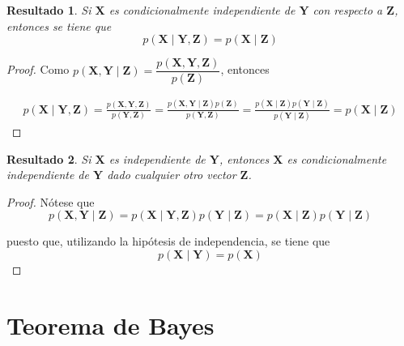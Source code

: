 \documentclass[
  10pt,
  spanish,
]{book}
\newtheorem{proposition}{Resultado}[chapter]
\theoremstyle{definition}
\theoremstyle{definition}
\theoremstyle{definition}
\theoremstyle{definition}
\theoremstyle{remark}
\begin{document}
\begin{proposition}
\protect\hypertarget{prp:Res122}{}{\label{prp:Res122} }Si \(\mathbf{X}\) es condicionalmente independiente de \(\mathbf{Y}\) con respecto a \(\mathbf{Z}\), entonces se tiene que
\begin{equation}
p(\mathbf{X} \mid \mathbf{Y},\mathbf{Z})=p(\mathbf{X} \mid \mathbf{Z})
\end{equation}
\end{proposition}

\begin{proof}
{}Como \(p(\mathbf{X},\mathbf{Y} \mid \mathbf{Z})=\dfrac{p(\mathbf{X},\mathbf{Y},\mathbf{Z})}{p(\mathbf{Z})}\), entonces

\begin{align*}
p(\mathbf{X} \mid \mathbf{Y},\mathbf{Z})=\frac{p(\mathbf{X},\mathbf{Y},\mathbf{Z})}{p(\mathbf{Y},\mathbf{Z})}
=\frac{p(\mathbf{X},\mathbf{Y} \mid \mathbf{Z})p(\mathbf{Z})}{p(\mathbf{Y},\mathbf{Z})}
=\frac{p(\mathbf{X} \mid \mathbf{Z})p(\mathbf{Y} \mid \mathbf{Z})}{p(\mathbf{Y} \mid \mathbf{Z})}=p(\mathbf{X} \mid \mathbf{Z})
\end{align*}
\end{proof}

\begin{proposition}
\protect\hypertarget{prp:unnamed-chunk-8}{}{\label{prp:unnamed-chunk-8} }Si \(\mathbf{X}\) es independiente de \(\mathbf{Y}\), entonces \(\mathbf{X}\) es condicionalmente independiente de \(\mathbf{Y}\) dado cualquier otro vector \(\mathbf{Z}\).
\end{proposition}

\begin{proof}
{}Nótese que
\begin{equation*}
p(\mathbf{X},\mathbf{Y}\mid \mathbf{Z})=p(\mathbf{X} \mid \mathbf{Y},\mathbf{Z})p(\mathbf{Y} \mid \mathbf{Z})=p(\mathbf{X} \mid \mathbf{Z})p(\mathbf{Y} \mid \mathbf{Z})
\end{equation*}

puesto que, utilizando la hipótesis de independencia, se tiene que
\begin{equation*}
p(\mathbf{X} \mid \mathbf{Y})=p(\mathbf{X})
\end{equation*}
\end{proof}

\hypertarget{teorema-de-bayes}{%
\section{Teorema de Bayes}\label{teorema-de-bayes}}
\end{document}
